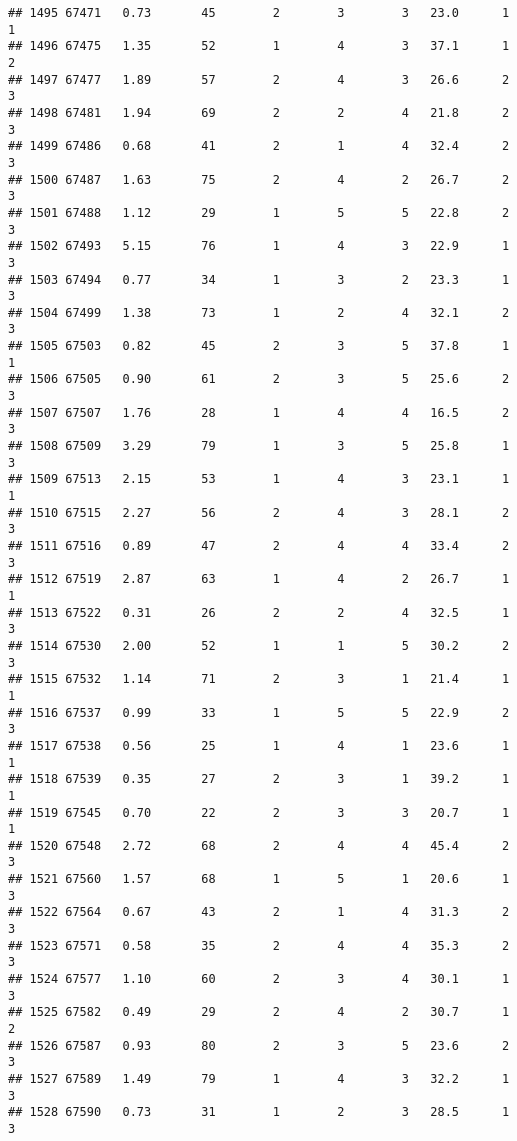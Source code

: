 \documentclass[
]{article}
\begin{document}
\begin{verbatim}
## 1495 67471   0.73       45        2        3        3   23.0      1      1
## 1496 67475   1.35       52        1        4        3   37.1      1      2
## 1497 67477   1.89       57        2        4        3   26.6      2      3
## 1498 67481   1.94       69        2        2        4   21.8      2      3
## 1499 67486   0.68       41        2        1        4   32.4      2      3
## 1500 67487   1.63       75        2        4        2   26.7      2      3
## 1501 67488   1.12       29        1        5        5   22.8      2      3
## 1502 67493   5.15       76        1        4        3   22.9      1      3
## 1503 67494   0.77       34        1        3        2   23.3      1      3
## 1504 67499   1.38       73        1        2        4   32.1      2      3
## 1505 67503   0.82       45        2        3        5   37.8      1      1
## 1506 67505   0.90       61        2        3        5   25.6      2      3
## 1507 67507   1.76       28        1        4        4   16.5      2      3
## 1508 67509   3.29       79        1        3        5   25.8      1      3
## 1509 67513   2.15       53        1        4        3   23.1      1      1
## 1510 67515   2.27       56        2        4        3   28.1      2      3
## 1511 67516   0.89       47        2        4        4   33.4      2      3
## 1512 67519   2.87       63        1        4        2   26.7      1      1
## 1513 67522   0.31       26        2        2        4   32.5      1      3
## 1514 67530   2.00       52        1        1        5   30.2      2      3
## 1515 67532   1.14       71        2        3        1   21.4      1      1
## 1516 67537   0.99       33        1        5        5   22.9      2      3
## 1517 67538   0.56       25        1        4        1   23.6      1      1
## 1518 67539   0.35       27        2        3        1   39.2      1      1
## 1519 67545   0.70       22        2        3        3   20.7      1      1
## 1520 67548   2.72       68        2        4        4   45.4      2      3
## 1521 67560   1.57       68        1        5        1   20.6      1      3
## 1522 67564   0.67       43        2        1        4   31.3      2      3
## 1523 67571   0.58       35        2        4        4   35.3      2      3
## 1524 67577   1.10       60        2        3        4   30.1      1      3
## 1525 67582   0.49       29        2        4        2   30.7      1      2
## 1526 67587   0.93       80        2        3        5   23.6      2      3
## 1527 67589   1.49       79        1        4        3   32.2      1      3
## 1528 67590   0.73       31        1        2        3   28.5      1      3

\end{verbatim}
\end{document}
